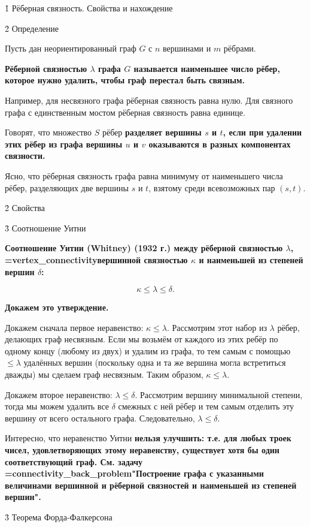 \h1{ Рёберная связность. Свойства и нахождение }


\h2{ Определение }

Пусть дан неориентированный граф $G$ с $n$ вершинами и $m$ рёбрами.

\bf{Рёберной связностью} $\lambda$ графа $G$ называется наименьшее число рёбер, которое нужно удалить, чтобы граф перестал быть связным.

Например, для несвязного графа рёберная связность равна нулю. Для связного графа с единственным мостом рёберная связность равна единице.

Говорят, что множество $S$ рёбер \bf{разделяет} вершины $s$ и $t$, если при удалении этих рёбер из графа вершины $u$ и $v$ оказываются в разных компонентах связности.

Ясно, что рёберная связность графа равна минимуму от наименьшего числа рёбер, разделяющих две вершины $s$ и $t$, взятому среди всевозможных пар $(s,t)$.


\h2{ Свойства }


\h3{ Соотношение Уитни }

\bf{Соотношение Уитни (Whitney)} (1932 г.) между рёберной связностью $\lambda$, \algohref=vertex_connectivity{вершинной связностью} $\kappa$ и наименьшей из степеней вершин $\delta$:

$$ \kappa \le \lambda \le \delta. $$

\bf{Докажем} это утверждение.

Докажем сначала первое неравенство: $\kappa \le \lambda$. Рассмотрим этот набор из $\lambda$ рёбер, делающих граф несвязным. Если мы возьмём от каждого из этих ребёр по одному концу (любому из двух) и удалим из графа, то тем самым с помощью $\le \lambda$ удалённых вершин (поскольку одна и та же вершина могла встретиться дважды) мы сделаем граф несвязным. Таким образом, $\kappa \le \lambda$.

Докажем второе неравенство: $\lambda \le \delta$. Рассмотрим вершину минимальной степени, тогда мы можем удалить все $\delta$ смежных с ней рёбер и тем самым отделить эту вершину от всего остального графа. Следовательно, $\lambda \le \delta$.

Интересно, что неравенство Уитни \bf{нельзя улучшить}: т.е. для любых троек чисел, удовлетворяющих этому неравенству, существует хотя бы один соответствующий граф. См. задачу \algohref=connectivity_back_problem{"Построение графа с указанными величинами вершинной и рёберной связностей и наименьшей из степеней вершин"}.


\h3{ Теорема Форда-Фалкерсона }

